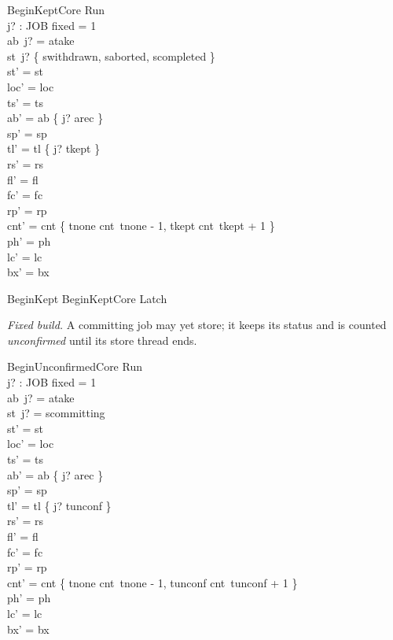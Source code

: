 \documentclass[a4paper,10pt,fleqn]{article}
\begin{document}
\begin{schema}{BeginKeptCore}
\Delta Run \\ j? : JOB
\where
fixed = 1 \\
ab~j? = atake \\
st~j? \in \{ swithdrawn, saborted, scompleted \} \\
st' = st \\
loc' = loc \\
ts' = ts \\
ab' = ab \oplus \{ j? \mapsto arec \} \\
sp' = sp \\
tl' = tl \oplus \{ j? \mapsto tkept \} \\
rs' = rs \\
fl' = fl \\
fc' = fc \\
rp' = rp \\
cnt' = cnt \oplus \{ tnone \mapsto cnt~tnone - 1, tkept \mapsto cnt~tkept + 1 \} \\
ph' = ph \\
lc' = lc \\
bx' = bx
\end{schema}

\begin{zed}
BeginKept  BeginKeptCore \land Latch
\end{zed}

\emph{Fixed build.} A committing job may yet store; it keeps its status and is
counted \emph{unconfirmed} until its store thread ends.

\begin{schema}{BeginUnconfirmedCore}
\Delta Run \\ j? : JOB
\where
fixed = 1 \\
ab~j? = atake \\
st~j? = scommitting \\
st' = st \\
loc' = loc \\
ts' = ts \\
ab' = ab \oplus \{ j? \mapsto arec \} \\
sp' = sp \\
tl' = tl \oplus \{ j? \mapsto tunconf \} \\
rs' = rs \\
fl' = fl \\
fc' = fc \\
rp' = rp \\
cnt' = cnt \oplus \{ tnone \mapsto cnt~tnone - 1, tunconf \mapsto cnt~tunconf + 1 \} \\
ph' = ph \\
lc' = lc \\
bx' = bx
\end{schema}
\end{document}
